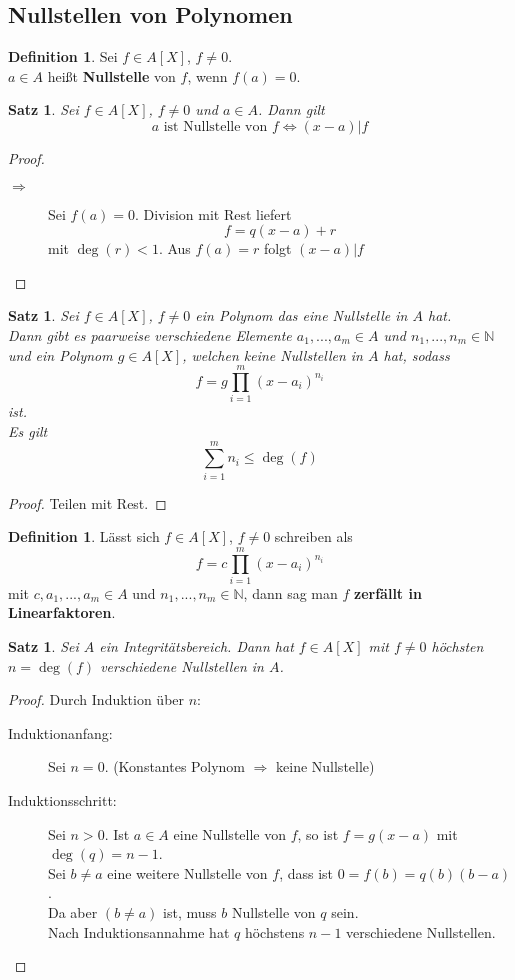 \documentclass[10pt,a4paper]{article}
\newcommand{\N}{\ensuremath{\mathbb{N}}}
\theoremstyle{plain}
\newtheorem{satz}[theorem]{Satz}
\theoremstyle{definition}
\newtheorem{definition}[theorem]{Definition}
\theoremstyle{remark}
\begin{document}
	\subsection{Nullstellen von Polynomen}
	\begin{definition}
		Sei $f\in A[X]$, $f\neq 0$.\\
		$a\in A$ heißt \textbf{Nullstelle} von $f$, wenn $f(a)=0$.
	\end{definition}

	\begin{satz}
		Sei $f\in A[X]$, $f\neq 0$ und $a\in A$. Dann gilt
		\[\text{$a$ ist Nullstelle von $f$}\Leftrightarrow (x-a)|f\]
	\end{satz}
	\begin{proof}
		\begin{description}
			\item[$\Rightarrow$] Sei $f(a)=0$. Division mit Rest liefert
			\[ f=q(x-a)+r\]
			mit $\deg(r)< 1$. Aus $f(a)=r$ folgt $(x-a)|f$
		\end{description}
	\end{proof}

	\begin{satz}
		Sei $f\in A[X]$, $f\neq 0$ ein Polynom das eine Nullstelle in $A$ hat.\\
		Dann gibt es paarweise verschiedene Elemente $a_1,...,a_m\in A$ und $n_1,...,n_m\in\N$ und ein Polynom $g\in A[X]$, welchen keine Nullstellen in $A$ hat, sodass
		\[f=g\prod_{i=1}^m(x-a_i)^{n_i}\]
		ist.\\
		Es gilt
		\[\sum_{i=1}^{m}n_i\leq\deg(f)\]
	\end{satz}
	\begin{proof}
		Teilen mit Rest.
	\end{proof}

	\begin{definition}
		Lässt sich $f\in A[X]$, $f\neq 0$ schreiben als
		\[f=c\prod_{i=1}^{m}(x-a_i)^{n_i}\]
		mit $c,a_1,...,a_m\in A$ und $n_1,...,n_m\in\N$, dann sag man $f$ \textbf{zerfällt in Linearfaktoren}.
	\end{definition}

	\begin{satz}
		Sei $A$ ein Integritätsbereich. Dann hat $f\in A[X]$ mit $f\neq 0$ höchsten $n=\deg(f)$ verschiedene Nullstellen in $A$.
	\end{satz}
	\begin{proof}
		Durch Induktion über $n$:
		\begin{description}
			\item[Induktionanfang:] Sei $n=0$. (Konstantes Polynom $\Rightarrow$ keine Nullstelle)
			\item[Induktionsschritt:] Sei $n>0$. Ist $a\in A$ eine Nullstelle von $f$, so ist $f=g(x-a)$ mit $\deg(q)=n-1$.\\
			Sei $b\neq a$ eine weitere Nullstelle von $f$, dass ist $0=f(b)=q(b)(b-a)$.\\
			Da aber $(b\neq a)$ ist, muss $b$ Nullstelle von $q$ sein.\\
			Nach Induktionsannahme hat $q$ höchstens $n-1$ verschiedene Nullstellen.
		\end{description}
	\end{proof}
\end{document}
